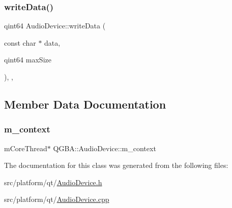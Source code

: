 \subsubsection{\texorpdfstring{write\+Data()}{writeData()}}
{\footnotesize\ttfamily qint64 Audio\+Device\+::write\+Data (\begin{DoxyParamCaption}\item[{const char $\ast$}]{data,  }\item[{qint64}]{max\+Size }\end{DoxyParamCaption})\hspace{0.3cm}{\ttfamily [override]}, {\ttfamily [protected]}, {\ttfamily [virtual]}}



\subsection{Member Data Documentation}
\mbox{\label{class_q_g_b_a_1_1_audio_device_a6579c062be4e726ed0b5d9766201296f}} 
\subsubsection{\texorpdfstring{m\+\_\+context}{m\_context}}
{\footnotesize\ttfamily m\+Core\+Thread$\ast$ Q\+G\+B\+A\+::\+Audio\+Device\+::m\+\_\+context\hspace{0.3cm}{\ttfamily [private]}}



The documentation for this class was generated from the following files\+:\begin{DoxyCompactItemize}
\item 
src/platform/qt/\mbox{\hyperlink{_audio_device_8h}{Audio\+Device.\+h}}\item 
src/platform/qt/\mbox{\hyperlink{_audio_device_8cpp}{Audio\+Device.\+cpp}}\end{DoxyCompactItemize}
